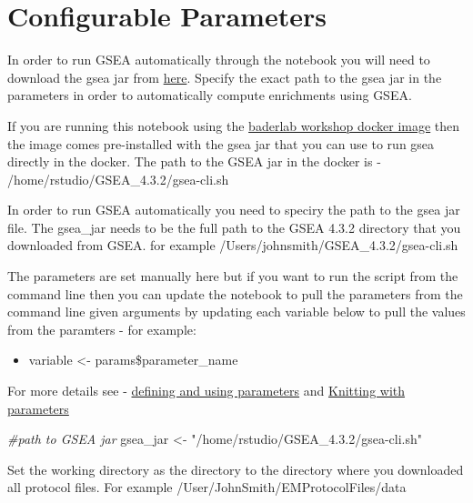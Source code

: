 \documentclass[
]{book}
\newenvironment{Shaded}{\begin{snugshade}}{\end{snugshade}}
\newcommand{\CommentTok}[1]{\textcolor[rgb]{0.56,0.35,0.01}{\textit{#1}}}
\newcommand{\NormalTok}[1]{#1}
\newcommand{\OtherTok}[1]{\textcolor[rgb]{0.56,0.35,0.01}{#1}}
\newcommand{\StringTok}[1]{\textcolor[rgb]{0.31,0.60,0.02}{#1}}
\providecommand{\tightlist}{%
  \setlength{\itemsep}{0pt}\setlength{\parskip}{0pt}}
\begin{document}
\hypertarget{configurable-parameters}{%
\section{Configurable Parameters}\label{configurable-parameters}}

In order to run GSEA automatically through the notebook you will need to download the gsea jar from \href{http://software.broadinstitute.org/gsea/downloads.jsp}{here}. Specify the exact path to the gsea jar in the parameters in order to automatically compute enrichments using GSEA.

If you are running this notebook using the \href{https://hub.docker.com/r/risserlin/workshop_base_image}{baderlab workshop docker image} then the image comes pre-installed with the gsea jar that you can use to run gsea directly in the docker. The path to the GSEA jar in the docker is - /home/rstudio/GSEA\_4.3.2/gsea-cli.sh

In order to run GSEA automatically you need to speciry the path to the gsea jar file.
The gsea\_jar needs to be the full path to the GSEA 4.3.2 directory that you downloaded from GSEA. for example /Users/johnsmith/GSEA\_4.3.2/gsea-cli.sh

The parameters are set manually here but if you want to run the script from the command line then you can update the notebook to pull the parameters from the command line given arguments by updating each variable below to pull the values from the paramters - for example:

\begin{itemize}
\tightlist
\item
  variable \textless- params\$parameter\_name
\end{itemize}

For more details see - \href{https://bookdown.org/yihui/rmarkdown/params-declare.html}{defining and using parameters} and \href{https://bookdown.org/yihui/rmarkdown/params-knit.html}{Knitting with parameters}

\begin{Shaded}
\begin{Highlighting}[]
\CommentTok{\#path to GSEA jar }
\NormalTok{gsea\_jar }\OtherTok{\textless{}{-}} \StringTok{"/home/rstudio/GSEA\_4.3.2/gsea{-}cli.sh"}
\end{Highlighting}
\end{Shaded}

Set the working directory as the directory to the directory where you downloaded all protocol files. For example /User/JohnSmith/EMProtocolFiles/data
\end{document}
